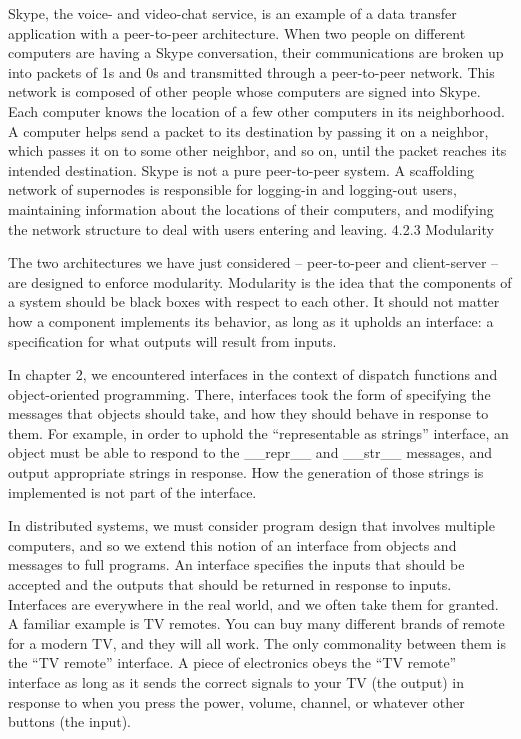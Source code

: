 \documentclass[letterpaper,10pt,dvipdfmx]{sphinxmanual}
\begin{document}
Skype, the voice- and video-chat service, is an example of a data transfer application with a peer-to-peer architecture. When two people on different computers are having a Skype conversation, their communications are broken up into packets of 1s and 0s and transmitted through a peer-to-peer network. This network is composed of other people whose computers are signed into Skype. Each computer knows the location of a few other computers in its neighborhood. A computer helps send a packet to its destination by passing it on a neighbor, which passes it on to some other neighbor, and so on, until the packet reaches its intended destination. Skype is not a pure peer-to-peer system. A scaffolding network of supernodes is responsible for logging-in and logging-out users, maintaining information about the locations of their computers, and modifying the network structure to deal with users entering and leaving.
4.2.3   Modularity

The two architectures we have just considered -- peer-to-peer and client-server -- are designed to enforce modularity. Modularity is the idea that the components of a system should be black boxes with respect to each other. It should not matter how a component implements its behavior, as long as it upholds an interface: a specification for what outputs will result from inputs.

In chapter 2, we encountered interfaces in the context of dispatch functions and object-oriented programming. There, interfaces took the form of specifying the messages that objects should take, and how they should behave in response to them. For example, in order to uphold the ``representable as strings'' interface, an object must be able to respond to the \_\_repr\_\_ and \_\_str\_\_ messages, and output appropriate strings in response. How the generation of those strings is implemented is not part of the interface.

In distributed systems, we must consider program design that involves multiple computers, and so we extend this notion of an interface from objects and messages to full programs. An interface specifies the inputs that should be accepted and the outputs that should be returned in response to inputs. Interfaces are everywhere in the real world, and we often take them for granted. A familiar example is TV remotes. You can buy many different brands of remote for a modern TV, and they will all work. The only commonality between them is the ``TV remote'' interface. A piece of electronics obeys the ``TV remote'' interface as long as it sends the correct signals to your TV (the output) in response to when you press the power, volume, channel, or whatever other buttons (the input).
\end{document}
